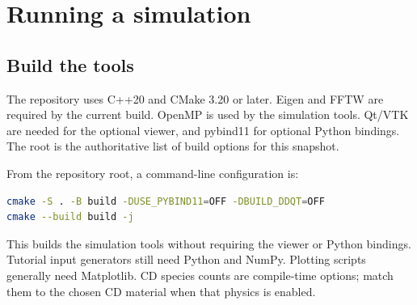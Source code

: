 \chapter{Running a simulation}\label{runningMoDELib}
\section{Build the tools}
The repository uses C++20 and CMake 3.20 or later. Eigen and FFTW are required by the current build. OpenMP is used by the simulation tools. Qt/VTK are needed for the optional viewer, and pybind11 for optional Python bindings. The root  is the authoritative list of build options for this snapshot.

From the repository root, a command-line configuration is:
\par\noindent\begin{minipage}{\linewidth}
\begin{lstlisting}[language=bash]
cmake -S . -B build -DUSE_PYBIND11=OFF -DBUILD_DDQT=OFF
cmake --build build -j
\end{lstlisting}
\end{minipage}\par
This builds the simulation tools without requiring the viewer or Python bindings. Tutorial input generators still need Python and NumPy. Plotting scripts generally need Matplotlib. CD species counts are compile-time options; match them to the chosen CD material when that physics is enabled.

